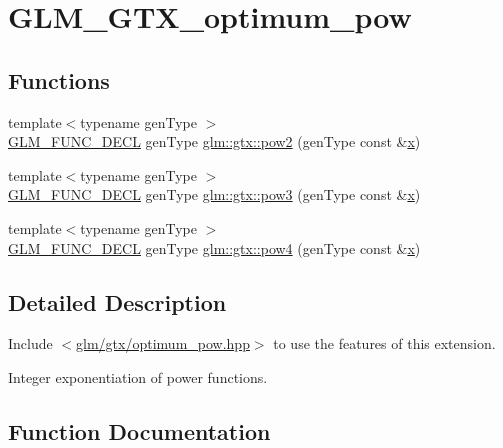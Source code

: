 \hypertarget{group__gtx__optimum__pow}{}\section{G\+L\+M\+\_\+\+G\+T\+X\+\_\+optimum\+\_\+pow}
\label{group__gtx__optimum__pow}
\subsection*{Functions}
\begin{DoxyCompactItemize}
\item 
{\footnotesize template$<$typename gen\+Type $>$ }\\\mbox{\hyperlink{setup_8hpp_ab2d052de21a70539923e9bcbf6e83a51}{G\+L\+M\+\_\+\+F\+U\+N\+C\+\_\+\+D\+E\+CL}} gen\+Type \mbox{\hyperlink{group__gtx__optimum__pow_ga19aaff3213bf23bdec3ef124ace237e9}{glm\+::gtx\+::pow2}} (gen\+Type const \&\mbox{\hyperlink{_s_d_l__opengl_8h_ad0e63d0edcdbd3d79554076bf309fd47}{x}})
\item 
{\footnotesize template$<$typename gen\+Type $>$ }\\\mbox{\hyperlink{setup_8hpp_ab2d052de21a70539923e9bcbf6e83a51}{G\+L\+M\+\_\+\+F\+U\+N\+C\+\_\+\+D\+E\+CL}} gen\+Type \mbox{\hyperlink{group__gtx__optimum__pow_ga35689d03cd434d6ea819f1942d3bf82e}{glm\+::gtx\+::pow3}} (gen\+Type const \&\mbox{\hyperlink{_s_d_l__opengl_8h_ad0e63d0edcdbd3d79554076bf309fd47}{x}})
\item 
{\footnotesize template$<$typename gen\+Type $>$ }\\\mbox{\hyperlink{setup_8hpp_ab2d052de21a70539923e9bcbf6e83a51}{G\+L\+M\+\_\+\+F\+U\+N\+C\+\_\+\+D\+E\+CL}} gen\+Type \mbox{\hyperlink{group__gtx__optimum__pow_gacef0968763026e180e53e735007dbf5a}{glm\+::gtx\+::pow4}} (gen\+Type const \&\mbox{\hyperlink{_s_d_l__opengl_8h_ad0e63d0edcdbd3d79554076bf309fd47}{x}})
\end{DoxyCompactItemize}


\subsection{Detailed Description}
Include $<$\mbox{\hyperlink{optimum__pow_8hpp}{glm/gtx/optimum\+\_\+pow.\+hpp}}$>$ to use the features of this extension.

Integer exponentiation of power functions. 

\subsection{Function Documentation}
\mbox{\label{group__gtx__optimum__pow_ga19aaff3213bf23bdec3ef124ace237e9}} 
